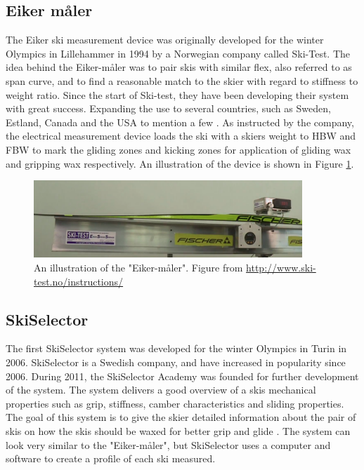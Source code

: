 \subsection{Eiker måler}
\label{subsec:eiker}
The Eiker ski measurement device was originally developed for the winter Olympics in Lillehammer in 1994 by a Norwegian company called Ski-Test. The idea behind the Eiker-måler was to pair skis with similar flex, also referred to as span curve, and to find a reasonable match to the skier with regard to stiffness to weight ratio. Since the start of Ski-test, they have been developing their system with great success. Expanding the use to several countries, such as Sweden, Estland, Canada and the USA  to mention a few \citep{eiker_2018}. As instructed by the company, the electrical measurement device loads the ski with a skiers weight to HBW and FBW to mark the gliding zones and kicking zones for application of gliding wax and gripping wax respectively. An illustration of the device is shown in Figure \ref{fig:eikermåler}.

\begin{figure}
    \centering
    \includegraphics[width=0.9\textwidth]{figures/eiker.png}
    \caption{An illustration of the "Eiker-måler". Figure from \url{http://www.ski-test.no/instructions/}}
    \label{fig:eikermåler}
\end{figure}

\subsection{SkiSelector}
\label{subsec:skiselector}
The first SkiSelector system was developed for the winter Olympics in Turin in 2006. SkiSelector is a Swedish company, and have increased in popularity since 2006. During 2011, the SkiSelector Academy was founded for further development of the system. The system delivers a good overview of a skis mechanical properties such as grip, stiffness, camber characteristics and sliding properties. The goal of this system is to give the skier detailed information about the pair of skis on how the skis should be waxed for better grip and glide \citep{skiselector_2018}. The system can look very similar to the "Eiker-måler", but SkiSelector uses a computer and software to create a profile of each ski measured.

